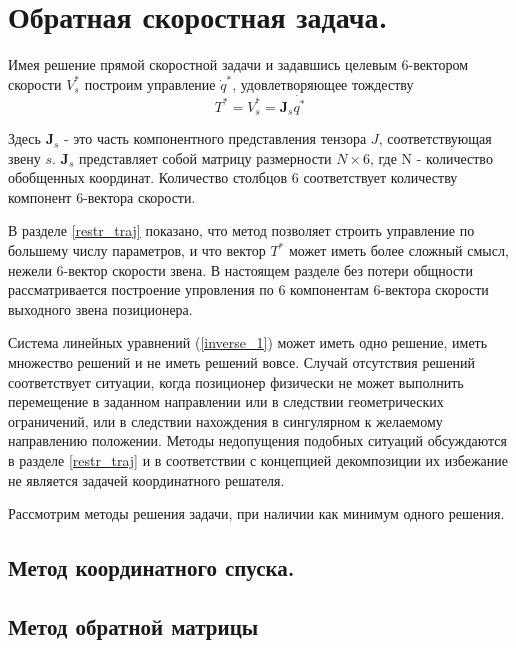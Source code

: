 \section{Обратная скоростная задача.}\label{invspd_sect}

Имея решение прямой скоростной задачи и задавшись целевым 6-вектором скорости $V_s^*$ построим управление $\dot{q}^{*}$, удовлетворяющее тождеству
\begin{equation}\label{inverse_1}
T^* = V_s^* = \textbf{J}_s\dot{q^*}  
\end{equation}

Здесь $\textbf{J}_s$ - это часть компонентного представления тензора $J$, соответствующая звену $s$. $\textbf{J}_s$ представляет собой матрицу размерности $N\times6$, где N - количество обобщенных координат. Количество столбцов $6$ соответствует количеству компонент 6-вектора скорости. 

\colorbox{shadecolor}
{\parbox{0.9\textwidth}{В разделе \ref{restr_traj} показано, что метод позволяет строить управление по большему числу параметров, и что вектор $T^*$ может иметь более сложный смысл, нежели 6-вектор скорости звена. В настоящем разделе без потери общности рассматривается построение упровления по 6 компонентам 6-вектора скорости выходного звена позиционера.}}

Система линейных уравнений (\ref{inverse_1}) может иметь одно решение, иметь множество решений и не иметь решений вовсе. Случай отсутствия решений соответствует ситуации, когда позиционер физически не может выполнить перемещение в заданном направлении или в следствии геометрических ограничений, или в следствии нахождения в сингулярном к желаемому направлению положении. Методы недопущения подобных ситуаций обсуждаются в разделе \ref{restr_traj} и в соответствии с концепцией декомпозиции их избежание не является задачей координатного решателя. 

Рассмотрим методы решения задачи, при наличии как минимум одного решения.

\subsection{Метод координатного спуска.}

\subsection{Метод обратной матрицы}
